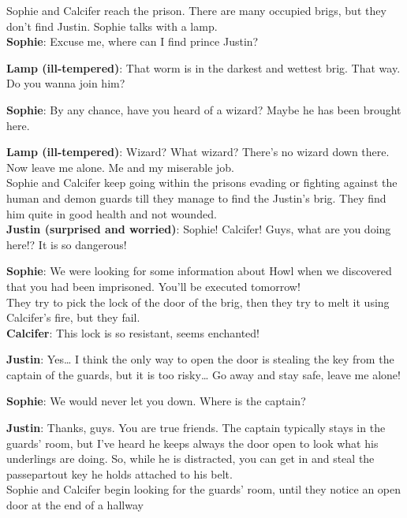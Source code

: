 \noindent Sophie and Calcifer reach the prison. There are many occupied brigs, but they don't find Justin.
Sophie talks with a lamp.\\

\textbf{Sophie}: Excuse me, where can I find prince Justin?

\textbf{Lamp (ill-tempered)}: That worm is in the darkest and wettest brig. That way. Do you wanna join him?

\textbf{Sophie}: By any chance, have you heard of a wizard? Maybe he has been brought here.

\textbf{Lamp (ill-tempered)}: Wizard? What wizard? There’s no wizard down there. Now leave me alone. Me and my miserable job.\\

\noindent Sophie and Calcifer keep going within the prisons evading or fighting against the human and demon guards till they manage to find the Justin’s brig. They find him quite in good health and not wounded.\\

\textbf{Justin (surprised and worried)}: Sophie! Calcifer! Guys, what are you doing here!? It is so dangerous!

\textbf{Sophie}: We were looking for some information about Howl when we discovered that you had been imprisoned. You’ll be executed tomorrow!\\

\noindent They try to pick the lock of the door of the brig, then they try to melt it using Calcifer's fire, but they fail.\\

\textbf{Calcifer}: This lock is so resistant, seems enchanted!

\textbf{Justin}: Yes… I think the only way to open the door is stealing the key from the captain of the guards, but it is too risky… Go away and stay safe, leave me alone!

\textbf{Sophie}: We would never let you down. Where is the captain?

\textbf{Justin}: Thanks, guys. You are true friends. The captain typically stays in the guards’ room, but I’ve heard he keeps always the door open to look what his underlings are doing. So, while he is distracted, you can get in and steal the passepartout key he holds attached to his belt.\\

\noindent Sophie and Calcifer begin looking for the guards’ room, until they notice an open door  at the end of a hallway\\

